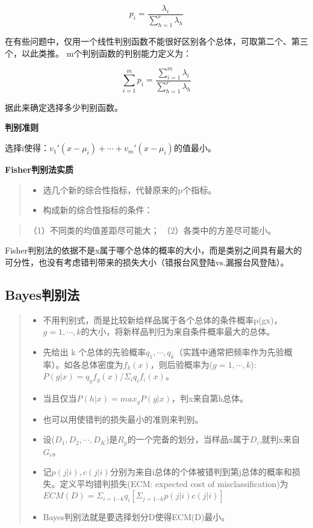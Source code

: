 \documentclass[]{ctexbook}
\providecommand{\tightlist}{%
  \setlength{\itemsep}{0pt}\setlength{\parskip}{0pt}}
\begin{document}
\[p_i=\frac{\lambda_i}{\sum_{h=1}^r \lambda_h}\]

在有些问题中，仅用一个线性判别函数不能很好区别各个总体，可取第二个、第三个，以此类推。 m个判别函数的判别能力定义为：

\[\sum_{i=1}^mp_i=\frac{\sum_{i=1}^m\lambda_i}{\sum_{h=1}^r \lambda_h}\]

据此来确定选择多少判别函数。

\textbf{判别准则}

选择i使得：\(v_1'(x-\mu_i)+\cdots+v_m'(x-\mu_i)\)的值最小。

\textbf{Fisher判别法实质}

\begin{quote}
\begin{itemize}
\tightlist
\item
  选几个新的综合性指标，代替原来的p个指标。
\item
  构成新的综合性指标的条件：
\end{itemize}
\end{quote}

\begin{quote}
（1）不同类的均值差距尽可能大；
（2）各类中的方差尽可能小。
\end{quote}

Fisher判别法的依据不是x属于哪个总体的概率的大小，而是类别之间具有最大的可分性，也没有考虑错判带来的损失大小（错报台风登陆vs.漏报台风登陆）。

\hypertarget{bayesux5224ux522bux6cd5}{%
\subsection{Bayes判别法}\label{bayesux5224ux522bux6cd5}}

\begin{quote}
\begin{itemize}
\tightlist
\item
  不用判别式，而是比较新给样品属于各个总体的条件概率p(g\textbar x)，\(g=1,\cdots,k\)的大小，将新样品判归为来自条件概率最大的总体。
\item
  先给出 k 个总体的先验概率\(q_1,\cdots,q_k\)（实践中通常把频率作为先验概率）。如各总体密度为\({f_k(x)}\)，则后验概率为(\(g=1,\cdots,k\)):\(P(g|x)=q_gf_g(x)/\Sigma_i q_if_i(x)\)。
\item
  当且仅当\(P(h|x)= max_gP(g|x)\)，判x来自第h总体。
\item
  也可以用使错判的损失最小的准则来判别。
\item
  设(\(D_1,D_2,\cdots,D_K\))是\(R_p\)的一个完备的划分，当样品x属于\(D_i\),就判x来自\(G_i\)。
\item
  记\(p(j|i), c(j|i)\)分别为来自i总体的个体被错判到第j总体的概率和损失。定义平均错判损失(ECM: expected cost of misclassification)为\(ECM(D)=\Sigma_{i=1\cdots k}q_i[\Sigma_{j=1\cdots k}p(j|i)c(j|i)]\)
\item
  Bayes判别法就是要选择划分D使得ECM(D)最小。
\end{itemize}
\end{quote}
\end{document}
